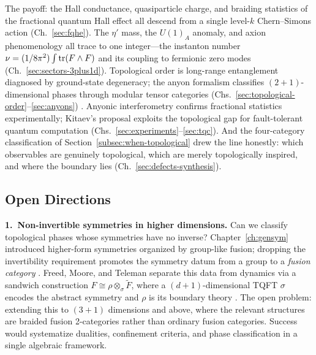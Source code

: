 The payoff: the Hall conductance, quasiparticle charge, and braiding statistics of the fractional quantum Hall effect all descend from a single level-$k$ Chern--Simons action (Ch.~\ref{sec:fqhe}). The $\eta'$ mass, the $U(1)_A$ anomaly, and axion phenomenology all trace to one integer---the instanton number $\nu = (1/8\pi^2)\int\operatorname{tr}(F\wedge F)$ and its coupling to fermionic zero modes (Ch.~\ref{sec:sectors-3plus1d}). Topological order is long-range entanglement diagnosed by ground-state degeneracy; the anyon formalism classifies $(2{+}1)$-dimensional phases through modular tensor categories (Chs.~\ref{sec:topological-order}--\ref{sec:anyons}) \cite{Wen1995TopologicalOrdersEdgeExcitations,NayakSimonSternFreedmanDasSarma2008NonabelianAnyons}. Anyonic interferometry confirms fractional statistics experimentally; Kitaev's proposal exploits the topological gap for fault-tolerant quantum computation (Chs.~\ref{sec:experiments}--\ref{sec:tqc}). And the four-category classification of Section~\ref{subsec:when-topological} drew the line honestly: which observables are genuinely topological, which are merely topologically inspired, and where the boundary lies (Ch.~\ref{sec:defects-synthesis}).

\subsection{Open Directions}
\label{subsec:open-directions}

\noindent\textbf{1.\ Non-invertible symmetries in higher dimensions.}
Can we classify topological phases whose symmetries have no inverse? Chapter~\ref{ch:gensym} introduced higher-form symmetries organized by group-like fusion; dropping the invertibility requirement promotes the symmetry datum from a group to a \emph{fusion category} \cite{GaiottoKapustinSeibergWillett2015GeneralizedSymmetries}. Freed, Moore, and Teleman separate this data from dynamics via a sandwich construction $F \cong \rho \otimes_\sigma \widetilde{F}$, where a $(d{+}1)$-dimensional TQFT $\sigma$ encodes the abstract symmetry and $\rho$ is its boundary theory \cite{FreedMooreTeleman2024TopologicalSymmetry}. The open problem: extending this to $(3{+}1)$ dimensions and above, where the relevant structures are braided fusion 2-categories rather than ordinary fusion categories. Success would systematize dualities, confinement criteria, and phase classification in a single algebraic framework.

